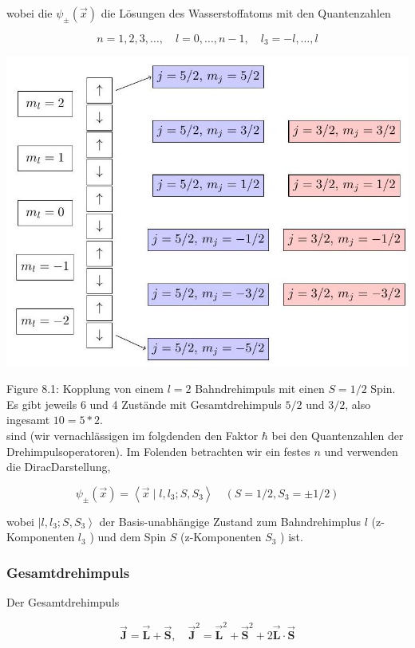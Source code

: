 \documentclass[10pt, letterpaper]{article}
\begin{document}
wobei die $\psi_{ \pm}(\vec{x})$ die Lösungen des Wasserstoffatoms mit den Quantenzahlen

$$
n=1,2,3, \ldots, \quad l=0, \ldots, n-1, \quad l_{3}=-l, \ldots, l
$$

\begin{center}
\includegraphics[max width=\textwidth]{2025_06_07_dbb046f06838039593f3g-09}
\end{center}

Figure 8.1: Kopplung von einem $l=2$ Bahndrehimpuls mit einen $S=1 / 2$ Spin. Es gibt jeweils 6 und 4 Zustände mit Gesamtdrehimpuls $5 / 2$ und $3 / 2$, also ingesamt $10=5 * 2$.\\
sind (wir vernachlässigen im folgdenden den Faktor $\hbar$ bei den Quantenzahlen der Drehimpulsoperatoren). Im Folenden betrachten wir ein festes $n$ und verwenden die DiracDarstellung,

$$
\psi_{ \pm}(\vec{x})=\left\langle\vec{x} \mid l, l_{3} ; S, S_{3}\right\rangle \quad\left(S=1 / 2, S_{3}= \pm 1 / 2\right)
$$

wobei $\left|l, l_{3} ; S, S_{3}\right\rangle$ der Basis-unabhängige Zustand zum Bahndrehimplus $l$ (z-Komponenten $l_{3}$ ) und dem Spin $S$ (z-Komponenten $S_{3}$ ) ist.

\subsubsection*{Gesamtdrehimpuls}
Der Gesamtdrehimpuls

$$
\overrightarrow{\mathbf{J}}=\overrightarrow{\mathbf{L}}+\overrightarrow{\mathbf{S}}, \quad \overrightarrow{\mathbf{J}}^{2}=\overrightarrow{\mathbf{L}}^{2}+\overrightarrow{\mathbf{S}}^{2}+2 \overrightarrow{\mathbf{L}} \cdot \overrightarrow{\mathbf{S}}
$$
\end{document}
